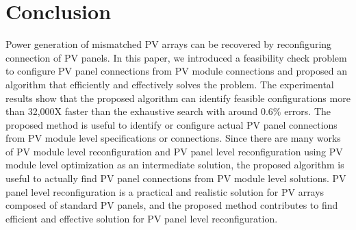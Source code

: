 \documentclass[conference]{pvsctran}
\begin{document}
\section{Conclusion}

Power generation of mismatched PV arrays can be recovered by reconfiguring connection of PV panels.
In this paper, we introduced a feasibility check problem to configure PV panel connections from PV module connections and proposed an algorithm that efficiently and effectively solves the problem. 
The experimental results show that the proposed algorithm can identify feasible configurations more than 32,000X faster than the exhaustive search with around 0.6\% errors. 
The proposed method is useful to identify or configure actual PV panel connections from PV module level specifications or connections. 
Since there are many works of PV module level reconfiguration and PV panel level reconfiguration using PV module level optimization as an intermediate solution, the proposed algorithm is useful to actually find PV panel connections from PV module level solutions.
PV panel level reconfiguration is a practical and realistic solution for PV arrays composed of standard PV panels, 
and the proposed method contributes to find efficient and effective solution for PV panel level reconfiguration.











\renewcommand\refname{Reference}


%
%
%
\end{document}
